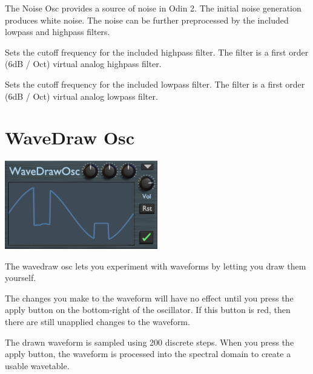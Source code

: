 The Noise Osc provides a source of noise in Odin 2. The initial noise generation produces white noise. The noise can be further preprocessed by the included lowpass and highpass filters.

{Sets the cutoff frequency for the included highpass filter. The filter is a first order (6dB / Oct) virtual analog highpass filter.}

{Sets the cutoff frequency for the included lowpass filter. The filter is a first order (6dB / Oct) virtual analog lowpass filter.}

\section{WaveDraw Osc}
\label{wavedraw}
\begin{center}
    \includegraphics[width=0.5\textwidth]{graphics/wavedraw_osc.png}
\end{center}
The wavedraw osc lets you experiment with waveforms by letting you draw them yourself.

\begin{tcolorbox}[colback=yellow!10!white,
        colframe=white!20!black,
        center,
        valign=top,
        halign=left,
        center title,
        width=\textwidth]

    The changes you make to the waveform will have no effect until you press the apply button on the bottom-right of the oscillator. If this button is red, then there are still unapplied changes to the waveform.
\end{tcolorbox}

The drawn waveform is sampled using 200 discrete steps. When you press the apply button, the waveform is processed into the spectral domain to create a usable wavetable.

